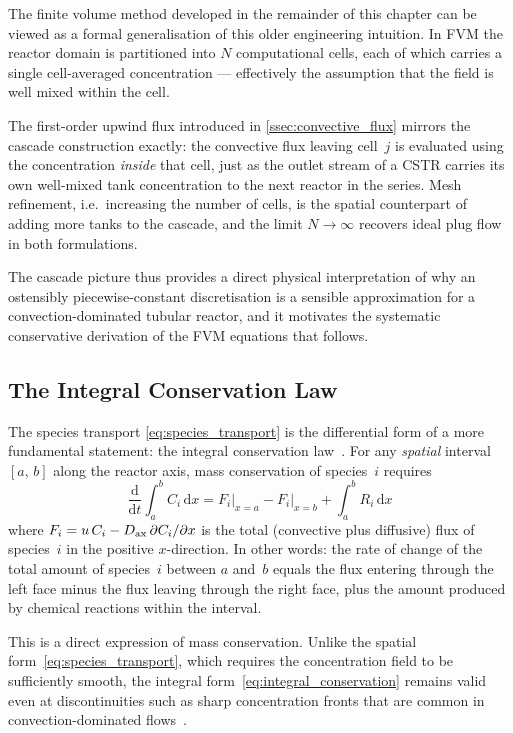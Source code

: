The finite volume method developed in the remainder of this chapter can be viewed as a formal generalisation of this older engineering intuition. In FVM the reactor domain is partitioned into \(N\) computational cells, each of which carries a single cell-averaged concentration --- effectively the assumption that the field is well mixed within the cell. 

The first-order upwind flux introduced in \cref{ssec:convective_flux} mirrors the cascade construction exactly: the convective flux leaving cell~\(j\) is evaluated using the concentration \emph{inside} that cell, just as the outlet stream of a CSTR carries its own well-mixed tank concentration to the next reactor in the series. Mesh refinement, i.e.\ increasing the number of cells, is the spatial counterpart of adding more tanks to the cascade, and the limit \(N \to \infty\) recovers ideal plug flow in both formulations. 

The cascade picture thus provides a direct physical interpretation of why an ostensibly piecewise-constant discretisation is a sensible approximation for a convection-dominated tubular reactor, and it motivates the systematic conservative derivation of the FVM equations that follows.

\subsection{The Integral Conservation Law}\label{ssec:conservation_law}

The species transport \cref{eq:species_transport} is the differential form of a more fundamental statement: the integral conservation law~\cite{LeVeque2002}. For any \emph{spatial} interval \([a,\,b]\) along the reactor axis, mass conservation of species~\(i\) requires
%
\begin{equation}
  \frac{\mathrm{d}}{\mathrm{d}t}
  \int_a^b C_i\,\mathrm{d}x
  = F_i\big|_{x=a} - F_i\big|_{x=b}
  + \int_a^b R_i\,\mathrm{d}x
  \label{eq:integral_conservation}
\end{equation}
%
where \(F_i = u\,C_i - D_{\mathrm{ax}}\,\partial C_i / \partial x\) is the total (convective plus diffusive) flux of species~\(i\) in the positive \(x\)-direction. In other words: the rate of change of the total amount of species~\(i\) between \(a\) and~\(b\) equals the flux entering through the left face minus the flux leaving through the right face, plus the amount produced by chemical reactions within the interval. 

This is a direct expression of mass conservation. Unlike the spatial form~\eqref{eq:species_transport}, which requires the concentration field to be sufficiently smooth, the integral form~\eqref{eq:integral_conservation} remains valid even at discontinuities such as sharp concentration fronts that are common in convection-dominated flows~\cite{LeVeque2002}. 

